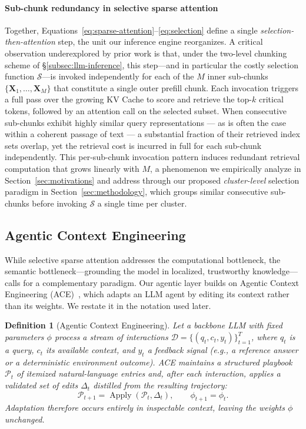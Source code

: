 \documentclass[10pt,conference]{IEEEtran}
\newtheorem{definition}{Definition}
\begin{document}
\paragraph{Sub-chunk redundancy in selective sparse attention}
Together, Equations~\eqref{eq:sparse-attention}--\eqref{eq:selection}
define a single \emph{selection-then-attention} step, the unit our
inference engine reorganizes. A critical observation underexplored by
prior work is that, under the two-level chunking scheme of
§\ref{subsec:llm-inference}, this step---and in particular the costly
selection function $\mathcal{S}$---is invoked independently for each of
the $M$ inner sub-chunks
$\{\mathbf{X}_1, \ldots, \mathbf{X}_M\}$ that constitute a single outer 
prefill chunk. Each invocation triggers a full pass over the growing KV 
Cache to score and retrieve the top-$k$ critical tokens, followed by an 
attention call on the selected subset. When consecutive sub-chunks 
exhibit highly similar query representations --- as is often the case 
within a coherent passage of text --- a substantial fraction of their 
retrieved index sets overlap, yet the retrieval cost is incurred in 
full for each sub-chunk independently. This per-sub-chunk invocation 
pattern induces redundant retrieval computation that grows linearly 
with $M$, a phenomenon we empirically analyze in 
Section~\ref{sec:motivations} and address through our proposed 
\textit{cluster-level} selection paradigm in 
Section~\ref{sec:methodology}, which groups similar consecutive 
sub-chunks before invoking $\mathcal{S}$ a single time per cluster.

\subsection{Agentic Context Engineering}
\label{subsec:prelim-ace}

While selective sparse attention addresses the computational bottleneck,
the semantic bottleneck---grounding the model in localized, trustworthy
knowledge---calls for a complementary paradigm. Our agentic layer builds
on Agentic Context Engineering (ACE)~\cite{agenticcontext2026}, which
adapts an LLM agent by editing its context rather than its weights. We
restate it in the notation used later.

\begin{definition}[Agentic Context Engineering]
\label{def:ace}
Let a backbone LLM with fixed parameters $\phi$ process a stream of
interactions $\mathcal{D}=\{(q_t,c_t,y_t)\}_{t=1}^{T}$, where $q_t$ is a
query, $c_t$ its available context, and $y_t$ a feedback signal (e.g., a
reference answer or a deterministic environment outcome). ACE maintains a
structured \emph{playbook} $\mathcal{P}_t$ of itemized natural-language
entries and, after each interaction, applies a validated set of edits
$\Delta_t$ distilled from the resulting trajectory:
\begin{equation}
    \mathcal{P}_{t+1}=\operatorname{Apply}(\mathcal{P}_t,\Delta_t),
    \qquad \phi_{t+1}=\phi_t.
    \label{eq:ace-context-update}
\end{equation}
Adaptation therefore occurs entirely in inspectable context, leaving the
weights $\phi$ unchanged.
\end{definition}
\end{document}
